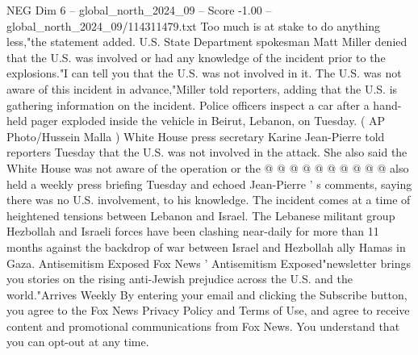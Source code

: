 \begin{textsample}{NEG Dim 6 – global\_north\_2024\_09 – Score -1.00 – global\_north\_2024\_09/114311479.txt}
Too much is at stake to do anything less,"the statement added.
U.S.
State Department spokesman Matt Miller denied that the U.S. was involved or had any knowledge of the incident prior to the explosions."I can tell you that the U.S. was not involved in it.
The U.S. was not aware of this incident in advance,"Miller told reporters, adding that the U.S. is gathering information on the incident.
Police officers inspect a car after a hand-held pager exploded inside the vehicle in Beirut, Lebanon, on Tuesday. ( AP Photo/Hussein Malla ) White House press secretary Karine Jean-Pierre told reporters Tuesday that the U.S. was not involved in the attack.
She also said the White House was not aware of the operation or the @ @ @ @ @ @ @ @ @ @ also held a weekly press briefing Tuesday and echoed Jean-Pierre ' s comments, saying there was no U.S. involvement, to his knowledge.
The incident comes at a time of heightened tensions between Lebanon and Israel.
The Lebanese militant group Hezbollah and Israeli forces have been clashing near-daily for more than 11 months against the backdrop of war between Israel and Hezbollah ally Hamas in Gaza.
Antisemitism Exposed Fox News ' Antisemitism Exposed"newsletter brings you stories on the rising anti-Jewish prejudice across the U.S. and the world."Arrives Weekly By entering your email and clicking the Subscribe button, you agree to the Fox News Privacy Policy and Terms of Use, and agree to receive content and promotional communications from Fox News.
You understand that you can opt-out at any time.

\end{textsample}
